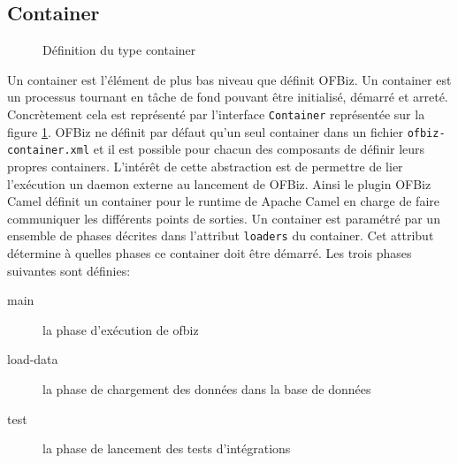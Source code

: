 \documentclass[a4paper, 11pt]{report}
\begin{document}
\subsection{Container}

\begin{figure}
  \centering
  \caption{Définition du type container}
  \label{fig:containertype}
\end{figure}

Un container est l'élément de plus bas niveau que définit OFBiz. Un
container est un processus tournant en tâche de fond pouvant être
initialisé, démarré et arreté. Concrètement cela est représenté par
l'interface \verb=Container= représentée sur la figure
\ref{fig:containertype}. OFBiz ne définit par défaut qu'un seul
container dans un fichier \verb=ofbiz-container.xml= et il est
possible pour chacun des composants de définir leurs propres
containers. L'intérêt de cette abstraction est de permettre de lier
l'exécution un daemon externe au lancement de OFBiz. Ainsi le plugin
OFBiz Camel définit un container pour le runtime de Apache Camel en
charge de faire communiquer les différents points de sorties. Un
container est paramétré par un ensemble de phases décrites dans
l'attribut \verb=loaders= du container. Cet attribut détermine à
quelles phases ce container doit être démarré. Les trois phases suivantes
sont définies:
\begin{description}
\item[main] la phase d'exécution de ofbiz
\item[load-data] la phase de chargement des données dans la base de
  données
\item[test] la phase de lancement des tests d'intégrations
\end{description}
\end{document}
